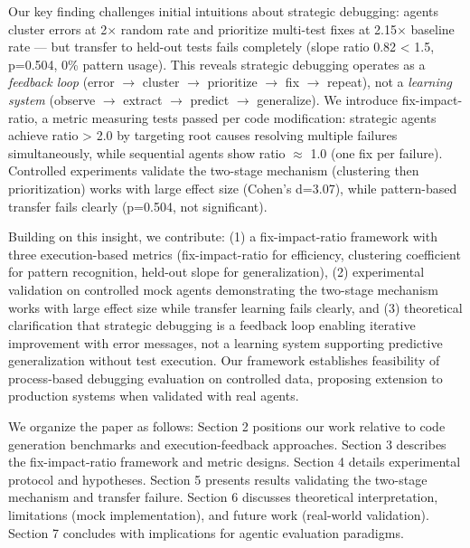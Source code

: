 Our key finding challenges initial intuitions about strategic debugging: agents cluster errors at 2$\times$ random rate and prioritize multi-test fixes at 2.15$\times$ baseline rate — but transfer to held-out tests fails completely (slope ratio 0.82 < 1.5, p=0.504, 0\% pattern usage). This reveals strategic debugging operates as a \emph{feedback loop} (error $\rightarrow$ cluster $\rightarrow$ prioritize $\rightarrow$ fix $\rightarrow$ repeat), not a \emph{learning system} (observe $\rightarrow$ extract $\rightarrow$ predict $\rightarrow$ generalize). We introduce fix-impact-ratio, a metric measuring tests passed per code modification: strategic agents achieve ratio > 2.0 by targeting root causes resolving multiple failures simultaneously, while sequential agents show ratio $\approx$ 1.0 (one fix per failure). Controlled experiments validate the two-stage mechanism (clustering then prioritization) works with large effect size (Cohen's d=3.07), while pattern-based transfer fails clearly (p=0.504, not significant).

Building on this insight, we contribute: (1) a fix-impact-ratio framework with three execution-based metrics (fix-impact-ratio for efficiency, clustering coefficient for pattern recognition, held-out slope for generalization), (2) experimental validation on controlled mock agents demonstrating the two-stage mechanism works with large effect size while transfer learning fails clearly, and (3) theoretical clarification that strategic debugging is a feedback loop enabling iterative improvement with error messages, not a learning system supporting predictive generalization without test execution. Our framework establishes feasibility of process-based debugging evaluation on controlled data, proposing extension to production systems when validated with real agents.

We organize the paper as follows: Section 2 positions our work relative to code generation benchmarks and execution-feedback approaches. Section 3 describes the fix-impact-ratio framework and metric designs. Section 4 details experimental protocol and hypotheses. Section 5 presents results validating the two-stage mechanism and transfer failure. Section 6 discusses theoretical interpretation, limitations (mock implementation), and future work (real-world validation). Section 7 concludes with implications for agentic evaluation paradigms.
